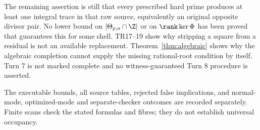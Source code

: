 The remaining assertion is still that every prescribed hard prime produces
at least one integral trace in that raw source, equivalently an original
opposite divisor pair. No lower bound on $|\Theta_{p,a}\cap\Z|$ or on
$\rank\ker\Phi$ has been proved that guarantees this for some shell. TR17--19
show why stripping a square from a residual is not an available replacement.
Theorem~\ref{thm:algebraic} shows why the algebraic completion cannot supply the
missing rational-root condition by itself. Turn 7 is not marked complete and
no witness-guaranteed Turn 8 procedure is asserted.

The executable bounds, all source tables, rejected false implications, and
normal-mode, optimized-mode and separate-checker outcomes are recorded separately. Finite scans
check the stated formulas and fibres; they do not establish universal occupancy.
